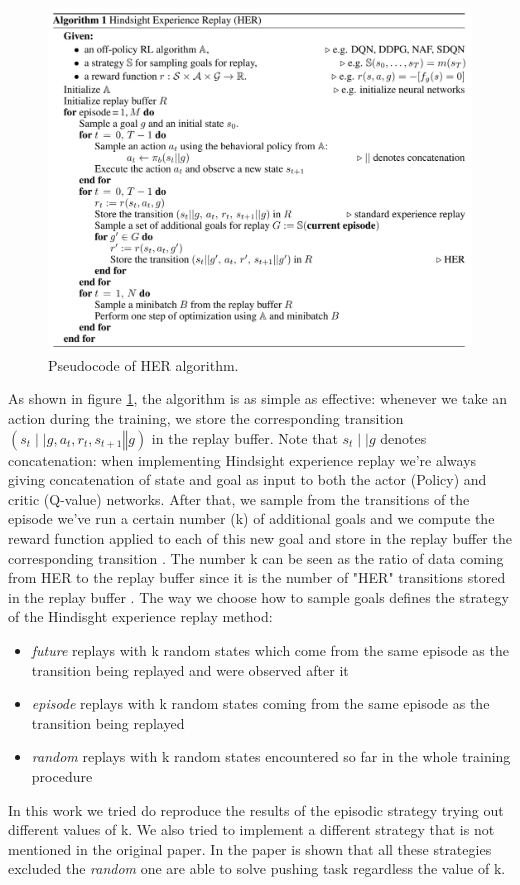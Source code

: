 \documentclass[a4paper]{report}
\begin{document}
\begin{figure}[h!]
\centering
\includegraphics[scale=0.5]{her.png}
\caption{\label{Fig: her} Pseudocode of HER algorithm.}
\end{figure}
As shown in figure \ref{Fig: her}, the algorithm is as simple as effective: whenever we take an action during the training, we store the corresponding transition $(s_t \mid\mid g , a_t, r_t, s_{t+1}\mathbin\Vert g)$ in the replay buffer. Note that $s_t \mid \mid g$ denotes concatenation: when implementing Hindsight experience replay we're always giving concatenation of state and goal as input to both the actor (Policy) and critic (Q-value) networks. 
 After that, we sample from the transitions of the episode we've run a certain number (k) of additional goals and we compute the reward function applied to each of this new goal and store in the replay buffer the corresponding transition . The number k can be seen as the ratio of data coming from HER to the replay buffer since it is the number of "HER" transitions stored in the replay buffer . The way we choose how to sample goals defines the strategy of the Hindisght experience replay method:
\begin{itemize}
\item \textit{future}  replays with k random states which come from the same episode as the transition being replayed and were observed after it
\item \textit{episode}  replays with k random states coming from the same episode as the transition being replayed
\item \textit{random}  replays with k random states encountered so far in the whole training procedure
\end{itemize}
In this work we tried do reproduce the results of the episodic strategy trying out different values of k. We also tried to implement a different strategy that is not mentioned in the original paper. In the paper is shown that all these strategies excluded the \textit{random} one are able to solve pushing task regardless the value of k.
\end{document}
